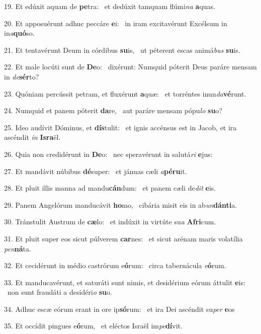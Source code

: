 19. Et edúxit aquam de \textbf{pe}tra: \ast\  et dedúxit tamquam flúmi\textit{na} \textbf{a}quas.\

20. Et apposuérunt adhuc peccáre \textbf{e}i: \ast\  in iram excitavérunt Excélsum in in\textit{a}\textbf{quó}so.\

21. Et tentavérunt Deum in córdibus \textbf{su}is, \ast\  ut péterent escas animá\textit{bus} \textbf{su}is.\

22. Et male locúti sunt de \textbf{De}o: \ast\  dixérunt: Numquid póterit Deus paráre mensam in \textit{de}\textbf{sér}to?\

23. Quóniam percússit petram, et fluxérunt \textbf{a}quæ: \ast\  et torréntes inun\textit{da}\textbf{vé}runt.\

24. Numquid et panem póterit \textbf{da}re, \ast\  aut paráre mensam pópu\textit{lo} \textbf{su}o?\

25. Ideo audívit Dóminus, et \textbf{dís}tulit: \ast\  et ignis accénsus est in Jacob, et ira ascéndit \textit{in} \textbf{Is}\textbf{ra}ël.\

26. Quia non credidérunt in \textbf{De}o: \ast\  nec speravérunt in salutá\textit{ri} \textbf{e}jus:\

27. Et mandávit núbibus \textbf{dé}super: \ast\  et jánuas cæli \textit{a}\textbf{pé}\textbf{ru}it.\

28. Et pluit illis manna ad mandu\textbf{cán}dum: \ast\  et panem cæli de\textit{dit} \textbf{e}is.\

29. Panem Angelórum manducávit \textbf{ho}mo, \ast\  cibária misit eis in ab\textit{un}\textbf{dán}\textbf{ti}a.\

30. Tránstulit Austrum de \textbf{cæ}lo: \ast\  et indúxit in virtúte su\textit{a} \textbf{A}\textbf{fri}cum.\

31. Et pluit super eos sicut púlverem \textbf{car}nes: \ast\  et sicut arénam maris volatília \textit{pen}\textbf{ná}ta.\

32. Et cecidérunt in médio castrórum e\textbf{ó}rum: \ast\  circa tabernácula \textit{e}\textbf{ó}rum.\

33. Et manducavérunt, et saturáti sunt nimis, et desidérium eórum áttulit \textbf{e}is: \ast\  non sunt fraudáti a desidéri\textit{o} \textbf{su}o.\

34. Adhuc escæ eórum erant in ore ip\textbf{só}rum: \ast\  et ira Dei ascéndit su\textit{per} \textbf{e}os\

35. Et occídit pingues e\textbf{ó}rum, \ast\  et eléctos Israël im\textit{pe}\textbf{dí}vit.\

